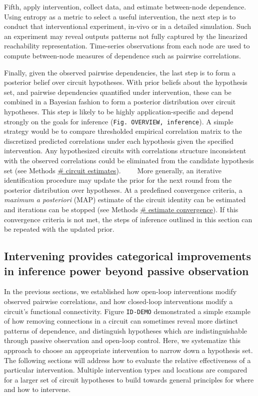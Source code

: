 \documentclass{article}
\begin{document}
Fifth, apply intervention, collect data, and estimate between-node dependence. Using entropy as a metric to select a useful intervention, the next step is to conduct that interventional experiment, in-vivo or in a detailed simulation. Such an experiment may reveal outputs patterns not fully captured by the linearized reachability representation. Time-series observations from each node are used to compute between-node measures of dependence such as pairwise correlations.

Finally, given the observed pairwise dependencies, the last step is to form a posterior belief over circuit hypotheses. With prior beliefs about the hypothesis set, and pairwise dependencies quantified under intervention, these can be combined in a Bayesian fashion to form a posterior distribution over circuit hypotheses. This step is likely to be highly application-specific and depend strongly on the goals for inference (\texttt{Fig.\ OVERVIEW,\ inference}). A simple strategy would be to compare thresholded empirical correlation matrix to the discretized predicted correlations under each hypothesis given the specified intervention. Any hypothesized circuits with correlations structure inconsistent with the observed correlations could be eliminated from the candidate hypothesis set (see Methods
\href{/section_content/methods_circuit_estimates.md}{\# circuit estimates}). ~~~~More generally, an iterative identification procedure may update the prior for the next round from the posterior distribution over hypotheses. At a predefined convergence criteria, a \emph{maximum a posteriori} (MAP) estimate of the circuit identity can be estimated and iterations can be stopped (see Methods
\href{/section_content/methods_entropy_selection.md}{\# estimate convergence}). If this convergence criteria is not met, the steps of inference outlined in this section can be repeated with the updated prior.

\hypertarget{intervening-provides-categorical-improvements-in-inference-power-beyond-passive-observation}{%
\subsection{Intervening provides categorical improvements in inference power beyond passive observation}\label{intervening-provides-categorical-improvements-in-inference-power-beyond-passive-observation}}

In the previous sections, we established how open-loop interventions modify observed pairwise correlations, and how closed-loop interventions modify a circuit's functional connectivity. Figure \texttt{ID-DEMO}
demonstrated a simple example of how removing connections in a circuit can sometimes reveal more distinct patterns of dependence, and distinguish hypotheses which are indistinguishable through passive observation and open-loop control. Here, we systematize this approach to choose an appropriate intervention to narrow down a hypothesis set. The following sections will address how to evaluate the relative effectiveness of a particular intervention. Multiple intervention types and locations are compared for a larger set of circuit hypotheses to build towards general principles for where and how to intervene.
\end{document}
